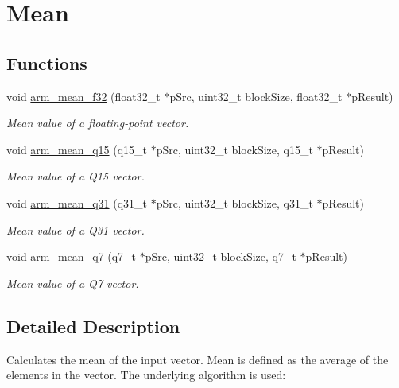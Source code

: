 \hypertarget{group__mean}{\section{Mean}
\label{group__mean}
}
\subsection*{Functions}
\begin{DoxyCompactItemize}
\item 
void \hyperlink{group__mean_ga74ce08c49ab61e57bd50c3a0ca1fdb2b}{arm\-\_\-mean\-\_\-f32} (float32\-\_\-t $\ast$p\-Src, uint32\-\_\-t block\-Size, float32\-\_\-t $\ast$p\-Result)
\begin{DoxyCompactList}\small\item\em Mean value of a floating-\/point vector. \end{DoxyCompactList}\item 
void \hyperlink{group__mean_gac882495d5f098819fd3939c1ef7795b3}{arm\-\_\-mean\-\_\-q15} (q15\-\_\-t $\ast$p\-Src, uint32\-\_\-t block\-Size, q15\-\_\-t $\ast$p\-Result)
\begin{DoxyCompactList}\small\item\em Mean value of a Q15 vector. \end{DoxyCompactList}\item 
void \hyperlink{group__mean_gacf2526d8c2d75e486e8f0b0e31877ad0}{arm\-\_\-mean\-\_\-q31} (q31\-\_\-t $\ast$p\-Src, uint32\-\_\-t block\-Size, q31\-\_\-t $\ast$p\-Result)
\begin{DoxyCompactList}\small\item\em Mean value of a Q31 vector. \end{DoxyCompactList}\item 
void \hyperlink{group__mean_gaebc707ee539020357c25da4c75b52eb7}{arm\-\_\-mean\-\_\-q7} (q7\-\_\-t $\ast$p\-Src, uint32\-\_\-t block\-Size, q7\-\_\-t $\ast$p\-Result)
\begin{DoxyCompactList}\small\item\em Mean value of a Q7 vector. \end{DoxyCompactList}\end{DoxyCompactItemize}


\subsection{Detailed Description}
Calculates the mean of the input vector. Mean is defined as the average of the elements in the vector. The underlying algorithm is used\-:


